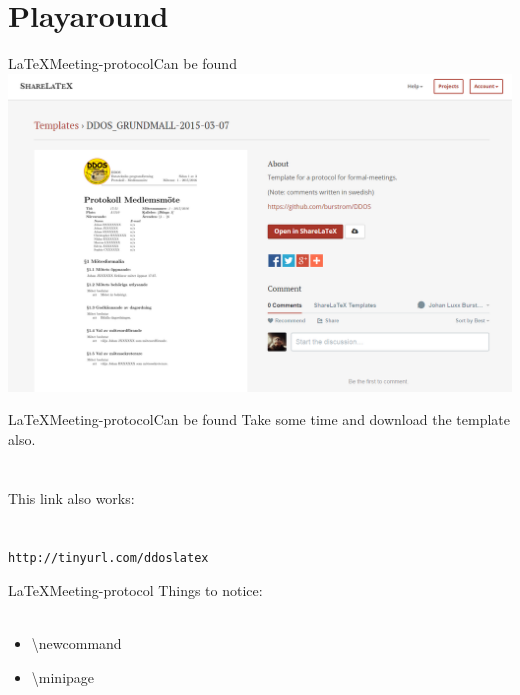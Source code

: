 \section{Playaround}
\begin{frame}{\LaTeX Meeting-protocol}{Can be found \where}
    \includegraphics[width=\textwidth]{img/3-protlatex.png}
\end{frame}

\begin{frame}{\LaTeX Meeting-protocol}{Can be found \where}
    Take some time and download the template also. \\ \ \\ \ \\
    \small This link also works: \\ \ \\ \ \\
    \normalsize
    \texttt{http://tinyurl.com/ddoslatex}
\end{frame}

\begin{frame}{\LaTeX Meeting-protocol}
	Things to notice: \\ \ 
	\begin{itemize}
	\item \textbackslash newcommand
	\item \textbackslash minipage
	\end{itemize} 
\end{frame}


